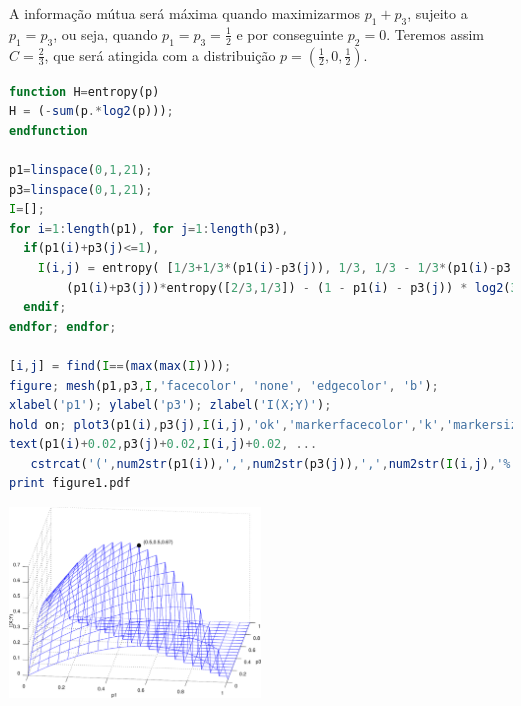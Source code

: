 \begin{questions}
\begin{solution}
A informação mútua será máxima quando maximizarmos $p_1 + p_3$, sujeito a $p_1 = p_3$, ou seja,
quando $p_1 = p_3 = \frac{1}{2}$ e por conseguinte $p_2 = 0$. Teremos assim $C = \frac{2}{3}$,
que será atingida com a distribuição $p = (\frac{1}{2}, 0, \frac{1}{2})$.

\begin{lstlisting}[language=Octave]
function H=entropy(p)
H = (-sum(p.*log2(p)));
endfunction

p1=linspace(0,1,21);
p3=linspace(0,1,21);
I=[]; 
for i=1:length(p1), for j=1:length(p3), 
  if(p1(i)+p3(j)<=1), 
    I(i,j) = entropy( [1/3+1/3*(p1(i)-p3(j)), 1/3, 1/3 - 1/3*(p1(i)-p3(j)) ] ) - ...
        (p1(i)+p3(j))*entropy([2/3,1/3]) - (1 - p1(i) - p3(j)) * log2(3); 
  endif; 
endfor; endfor;

[i,j] = find(I==(max(max(I))));
figure; mesh(p1,p3,I,'facecolor', 'none', 'edgecolor', 'b');
xlabel('p1'); ylabel('p3'); zlabel('I(X;Y)');
hold on; plot3(p1(i),p3(j),I(i,j),'ok','markerfacecolor','k','markersize',8);
text(p1(i)+0.02,p3(j)+0.02,I(i,j)+0.02, ... 
   cstrcat('(',num2str(p1(i)),',',num2str(p3(j)),',',num2str(I(i,j),'%.2f'),')'));
print figure1.pdf
\end{lstlisting}

\includegraphics[width=0.5\textwidth]{../images/figure1.pdf}



\end{solution}
\end{questions}

